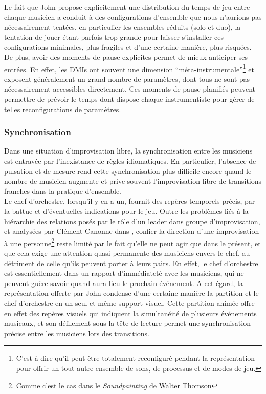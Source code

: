 \noindent Le fait que John propose explicitement une distribution du temps de jeu entre chaque musicien a conduit à des configurations d'ensemble que nous n'aurions pas nécessairement tentées, en particulier les ensembles réduits (solo et duo), la tentation de jouer étant parfois trop grande pour laisser s'installer ces configurations minimales, plus fragiles et d'une certaine manière, plus risquées.\\
\indent De plus, avoir des moments de pause explicites permet de mieux anticiper ses entrées. En effet, les \glspl{DMI} ont souvent une dimension ``méta-instrumentale''\footnote{C'est-à-dire qu'il peut être totalement reconfiguré pendant la représentation pour offrir un tout autre ensemble de sons, de processus et de modes de jeu.} et exposent généralement un grand nombre de paramètres, dont tous ne sont pas nécessairement accessibles directement. Ces moments de pause planifiés peuvent permettre de prévoir le temps dont dispose chaque instrumentiste pour gérer de telles reconfigurations de paramètres.

\subsubsection{Synchronisation}

\noindent Dans une situation d'improvisation libre, la synchronisation entre les musiciens est entravée par l'inexistance de règles idiomatiques. En particulier, l'absence de pulsation et de mesure rend cette synchronisation plus difficile encore quand le nombre de musicien augmente et prive souvent l'improvisation libre de transitions franches dans la pratique d'ensemble.\\
\indent Le chef d'orchestre, lorsqu'il y en a un, fournit des repères temporels précis, par la battue et d'éventuelles indications pour le jeu. Outre les problèmes liés à la hiérarchie des relations posés par le rôle d'un leader dans groupe d'improvisation, et analysées par Clément Canonne dans \cite{canonne_improvisation_2012}, confier la direction d'une improvisation à une personne\footnote{Comme c'est le cas dans le \textit{Soundpainting} de Walter Thomson} reste limité par le fait qu'elle ne peut agir que dans le présent, et que cela exige une attention quasi-permanente des musiciens envers le chef, au détriment de celle qu'ils peuvent porter à leurs pairs. En effet, le chef d'orchestre est essentiellement dans un rapport d'immédiateté avec les musiciens, qui ne peuvent guère savoir quand aura lieu le prochain événement. A cet égard, la représentation offerte par John condense d'une certaine manière la partition et le chef d'orchestre en un seul et même support visuel. Cette partition animée offre en effet des repères visuels qui indiquent la simultanéité de plusieurs événements musicaux, et son défilement sous la tête de lecture permet une synchronisation précise entre les musiciens lors des transitions.

